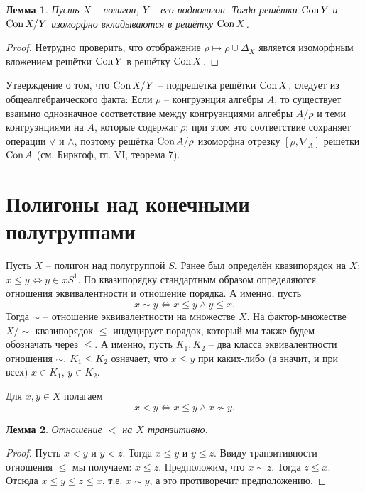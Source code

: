 \documentclass[a4paper]{article}
\newtheorem{lemma}{Лемма}
\newcommand{\Con}{\textnormal{Con}\, }
\begin{document}
	\begin{lemma} \label{l01}
		Пусть $X$ -- полигон, $Y$ -- его подполигон. Тогда решётки $\Con Y$ и $\Con {X}/{Y}$ изоморфно вкладываются в решётку $\Con X$.
	\end{lemma}
	\begin{proof}
		Нетрудно проверить, что отображение $\rho \mapsto \rho \cup \Delta_X$ является изоморфным вложением решётки $\Con Y$ в решётку $\Con X$.
	\end{proof}
	Утверждение о том, что $\Con {X}/{Y}$ -- подрешётка решётки $\Con X$, следует из общеалгебраического факта: Если $\rho$ -- конгруэнция алгебры $A$, то существует взаимно однозначное соответствие между конгруэнциями алгебры ${A}/{\rho}$ и теми конгруэнциями на $A$, которые содержат $\rho$; при этом это соответствие сохраняет операции $\vee$ и $\wedge$, поэтому решётка $\Con {A}/{\rho}$ изоморфна отрезку $[\rho, \nabla_A]$ решётки $\Con A$ (см. Биркгоф, гл. VI, теорема 7).
	
	\section*{Полигоны над конечными полугруппами}
	
	Пусть $X$ -- полигон над полугруппой $S$. Ранее был определён квазипорядок на $X$: $ x \leqslant y \Leftrightarrow y \in xS^1 $. По квазипорядку стандартным образом определяются отношения эквивалентности и отношение порядка. А именно, пусть $$ x \sim y \Leftrightarrow x \leqslant y \wedge y \leqslant x. $$ Тогда $\sim$ -- отношение эквивалентности на множестве $X$. На фактор-множестве ${X}/{\sim}$ квазипорядок $\leqslant$ индуцирует порядок, который мы также будем обозначать через $\leqslant$. А именно, пусть $K_1,K_2$ -- два класса эквивалентности отношения $\sim$. $K_1 \leqslant K_2$ означает, что $x \leqslant y$ при каких-либо (а значит, и при всех) $x \in K_1$, $y \in K_2$.
	\par Для $x,y \in X$ полагаем $$ x < y \Leftrightarrow x \leqslant y \wedge x \nsim y. $$
	
	\begin{lemma} \label{l03}
		Отношение $<$ на $X$ транзитивно.
	\end{lemma}
	\begin{proof}
		Пусть $x < y$ и $y < z$. Тогда $x \leqslant y$ и $y \leqslant z$. Ввиду транзитивности отношения $\leqslant$ мы получаем: $x \leqslant z$. Предположим, что $x \sim z$. Тогда  $z \leqslant x$. Отсюда $x \leqslant y \leqslant z \leqslant x$, т.е. $x \sim y$, а это противоречит предположению.
	\end{proof}
	
\end{document}
